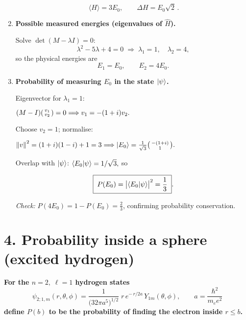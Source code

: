 \documentclass[12pt]{article}
\begin{document}
\begin{enumerate}[label=\textbf{\alph*)},itemsep=1.5\baselineskip]
\[
\boxed{\,
   \langle H\rangle = 3E_{0},\qquad
   \Delta H = E_{0}\sqrt{2}\,}.
\]

\item \textbf{Possible measured energies (eigenvalues of $\hat H$).}

Solve $\det(M-\lambda I)=0$:
\[
\lambda^{2}-5\lambda+4=0
\;\Longrightarrow\;
\lambda_{1}=1,\quad
\lambda_{2}=4,
\]
so the physical energies are
\[
\boxed{E_{1}=E_{0},\qquad E_{2}=4E_{0}}.
\]

\item \textbf{Probability of measuring $E_{0}$ in the state $\ket{\psi}$.}

Eigenvector for $\lambda_{1}=1$:

\(
(M-I)
\begin{psmallmatrix}v_{1}\\v_{2}\end{psmallmatrix}=0
\Longrightarrow
v_{1}=-(1+i)v_{2}.
\)

Choose $v_{2}=1$; normalise:

\(
\norm{v}^{2}=(1+i)(1-i)+1=3
\Longrightarrow
\ket{E_{0}}=\frac{1}{\sqrt3}
  \begin{psmallmatrix}-(1+i)\\1\end{psmallmatrix}.
\)

Overlap with $\ket{\psi}$:
\(
\braket{E_{0}}{\psi}=1/\sqrt3,
\)
so

\[
\boxed{\;
  P(E_{0}) = \bigl|\braket{E_{0}}{\psi}\bigr|^{2}= \frac{1}{3}\; }.
\]

\emph{Check:} $P(4E_{0})=1-P(E_{0})=\tfrac23$, confirming probability
conservation.

\end{enumerate}















\newpage
\section*{4.\; Probability inside a sphere (excited hydrogen)}

\textbf{For the $n=2,\;\ell =1$ hydrogen states}
\[
\psi_{2;1,m}(r,\theta,\phi)=
\frac{1}{\!\bigl(32\pi a^{5}\bigr)^{1/2}}\;
r\,e^{-\,r/2a}\,Y_{1m}(\theta,\phi),
\qquad 
a=\frac{\hbar^{2}}{m_{e}e^{2}}
\]
\textbf{define $P(b)$ to be the probability of finding the electron inside
$r\le b$.}
\end{document}
